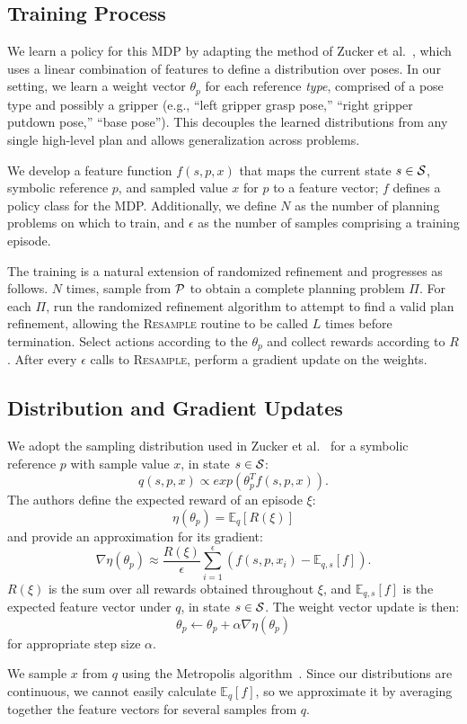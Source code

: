 \subsection{Training Process}
We learn a policy for this MDP by adapting the method of Zucker et al.~\cite{workspacebias}, which
uses a linear combination of features to define a distribution over poses. In our setting, we learn a weight
vector $\theta_{p}$ for each reference \emph{type}, comprised of a pose type and possibly a gripper
(e.g., ``left gripper grasp pose,'' ``right gripper putdown pose,'' ``base pose'').
This decouples the learned distributions from any single high-level plan and allows generalization across problems.

We develop a feature function $f(s, p, x)$ that maps the current
state $s \in \mathcal{S}$, symbolic reference $p$, and sampled value $x$ for $p$ to a
feature vector; $f$ defines a policy class for the MDP. Additionally, we define
$N$ as the number of planning problems on which to train, and
$\epsilon$ as the number of samples comprising a training episode.

The training is a natural extension of randomized
refinement and progresses as follows. $N$ times, sample from $\mathcal{P}$ to obtain
a complete planning problem $\Pi$. For each $\Pi$, run the randomized refinement
algorithm to attempt to find a valid plan refinement, allowing the \textsc{Resample}
routine to be called $L$ times before termination. Select actions according to the $\theta_{p}$
and collect rewards according to $R$. After every $\epsilon$ calls to
\textsc{Resample}, perform a gradient update on the weights.

\subsection{Distribution and Gradient Updates}
We adopt the sampling distribution used in Zucker et al.~\cite{workspacebias}
for a symbolic reference $p$ with sample value $x$, in state $s \in \mathcal{S}$:
$$q(s, p, x) \propto exp(\theta_{p}^{T} f(s, p, x)).$$
The authors define the expected reward of an episode $\xi$:
$$\eta(\theta_{p}) = \mathbb{E}_{q}[R(\xi)]$$ and provide an approximation for its gradient:
$$\nabla \eta(\theta_{p}) \approx \frac{R(\xi)}{\epsilon} \sum_{i=1}^{\epsilon}(f(s, p, x_{i}) - \mathbb{E}_{q,s}[f]).$$
$R(\xi)$ is the sum over all rewards obtained throughout $\xi$, and
$\mathbb{E}_{q,s}[f]$ is the expected feature vector under $q$, in state $s \in \mathcal{S}$. The weight vector update is then:
$$\theta_{p} \leftarrow \theta_{p} + \alpha \nabla \eta(\theta_{p})$$
for appropriate step size $\alpha$.

We sample $x$ from $q$ using the Metropolis algorithm~\cite{chib1995understanding}.
Since our distributions are continuous, we cannot easily calculate $\mathbb{E}_{q}[f]$,
so we approximate it by averaging together the feature vectors for several samples from $q$.